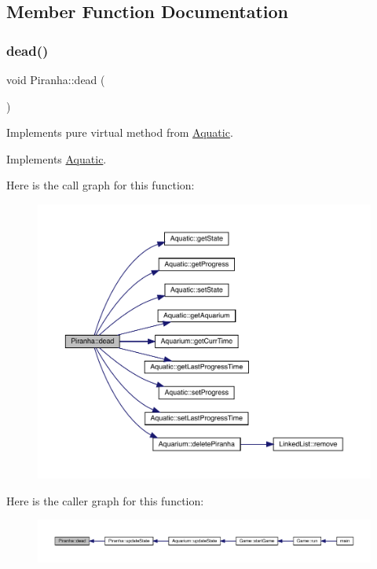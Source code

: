 \subsection{Member Function Documentation}
\mbox{\label{class_piranha_a1f30b46fb909558c44eba327e99d5f2e}} 
\subsubsection{\texorpdfstring{dead()}{dead()}}
{\footnotesize\ttfamily void Piranha\+::dead (\begin{DoxyParamCaption}{ }\end{DoxyParamCaption})\hspace{0.3cm}{\ttfamily [virtual]}}



Implements pure virtual method from \mbox{\hyperlink{class_aquatic}{Aquatic}}. 



Implements \mbox{\hyperlink{class_aquatic_a22fdb11e9cfec922fe50638709768276}{Aquatic}}.

Here is the call graph for this function\+:\nopagebreak
\begin{figure}[H]
\begin{center}
\leavevmode
\includegraphics[width=350pt]{class_piranha_a1f30b46fb909558c44eba327e99d5f2e_cgraph}
\end{center}
\end{figure}
Here is the caller graph for this function\+:\nopagebreak
\begin{figure}[H]
\begin{center}
\leavevmode
\includegraphics[width=350pt]{class_piranha_a1f30b46fb909558c44eba327e99d5f2e_icgraph}
\end{center}
\end{figure}
\mbox{\label{class_piranha_aee107987f36631002f04c5283564382b}} 
